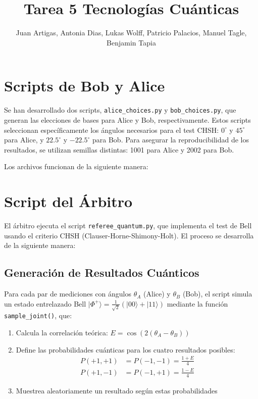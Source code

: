 \documentclass[11pt]{article}
\title{Tarea 5 Tecnologías Cuánticas}
\author{Juan Artigas,
    Antonia Dias,
    Lukas Wolff,
    Patricio Palacios,
    Manuel Tagle,
    Benjamin Tapia}
\date{}
\begin{document}
\maketitle

\section{Scripts de Bob y Alice}

Se han desarrollado dos scripts, \texttt{alice\_choices.py} y \texttt{bob\_choices.py}, que generan las elecciones de bases para Alice y Bob, respectivamente. Estos scripts seleccionan específicamente los ángulos necesarios para el test CHSH: $0^\circ$ y $45^\circ$ para Alice, y $22.5^\circ$ y $-22.5^\circ$ para Bob. Para asegurar la reproducibilidad de los resultados, se utilizan semillas distintas: 1001 para Alice y 2002 para Bob.

Los archivos funcionan de la siguiente manera:

\section{Script del Árbitro}

El árbitro ejecuta el script \texttt{referee\_quantum.py}, que implementa el test de Bell usando el criterio CHSH (Clauser-Horne-Shimony-Holt). El proceso se desarrolla de la siguiente manera:

\subsection{Generación de Resultados Cuánticos}

Para cada par de mediciones con ángulos $\theta_A$ (Alice) y $\theta_B$ (Bob), el script simula un estado entrelazado Bell $|\Phi^+\rangle = \frac{1}{\sqrt{2}}(|00\rangle + |11\rangle)$ mediante la función \texttt{sample\_joint()}, que:

\begin{enumerate}
    \item Calcula la correlación teórica: $E = \cos(2(\theta_A - \theta_B))$
    \item Define las probabilidades cuánticas para los cuatro resultados posibles:
    \begin{align}
        P(+1,+1) &= P(-1,-1) = \frac{1+E}{4} \\
        P(+1,-1) &= P(-1,+1) = \frac{1-E}{4}
    \end{align}
    \item Muestrea aleatoriamente un resultado según estas probabilidades
\end{enumerate}
\end{document}
